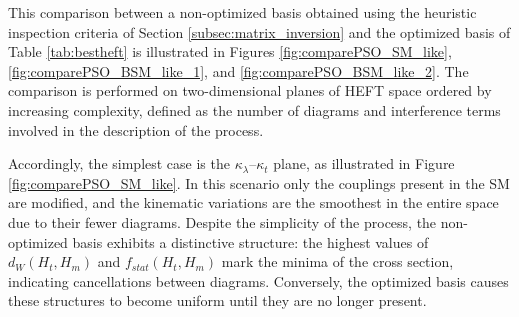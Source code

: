 This comparison between a non-optimized basis obtained using the heuristic inspection criteria of Section \ref{subsec:matrix_inversion} and the optimized basis of Table \ref{tab:bestheft} is illustrated in Figures \ref{fig:comparePSO_SM_like}, \ref{fig:comparePSO_BSM_like_1}, and \ref{fig:comparePSO_BSM_like_2}. The comparison is performed on two-dimensional planes of HEFT space ordered by increasing complexity, defined as the number of diagrams and interference terms involved in the description of the process.

Accordingly, the simplest case is the $\kappa_\lambda$–$\kappa_t$ plane, as illustrated in Figure \ref{fig:comparePSO_SM_like}. In this scenario only the couplings present in the SM are modified, and the kinematic variations are the smoothest in the entire space due to their fewer diagrams. Despite the simplicity of the process, the non-optimized basis exhibits a distinctive structure: the highest values of $d_W(H_{t},H_{m})$ and $f_{stat}(H_{t},H_{m})$ mark the minima of the cross section, indicating cancellations between diagrams. Conversely, the optimized basis causes these structures to become uniform until they are no longer present.


